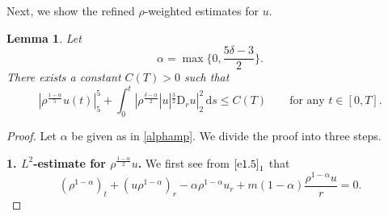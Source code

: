 \documentclass[11pt,reqno]{amsart}
\newtheorem{lem}{Lemma}[section]
\numberwithin{rk}{section}
\numberwithin{prop}{section}
\numberwithin{mydef}{section}
\numberwithin{lem}{section}
\numberwithin{equation}{section}
\numberwithin{thm}{section}
\begin{document}
Next, we show the refined $\rho$-weighted estimates for $u$.
\begin{lem}\label{ele-0}
Let 
\begin{equation}\label{alphamp}
\alpha=\max\big\{0,\frac{5\delta-3}{2}\big\}. 
\end{equation}
There  exists  a constant $C(T)>0$ such that 
\begin{equation*}
|\rho^\frac{1-\alpha}{5} u(t)|_5^5 +\int_0^t |\rho^\frac{\delta-\alpha}{2}|u|^\frac{3}{2}\mathrm{D}_r u|_2^2\,\mathrm{d}s\leq C(T) \qquad\text{for any $t\in [0,T]$}.
\end{equation*}
\end{lem}
\begin{proof}
Let $\alpha$ be given as in \eqref{alphamp}. We divide the proof into three steps.


\smallskip
\textbf{1. $L^2$-estimate for $\rho^\frac{1-\alpha}{2}u$.} We first see from $\eqref{e1.5}_1$ that
\begin{equation}\label{mass-alpha}
(\rho^{1-\alpha})_t+(u\rho^{1-\alpha})_r-\alpha\rho^{1-\alpha}u_r+m(1-\alpha)\frac{\rho^{1-\alpha}u}{r}=0.
\end{equation}


\end{proof}
\end{document}
